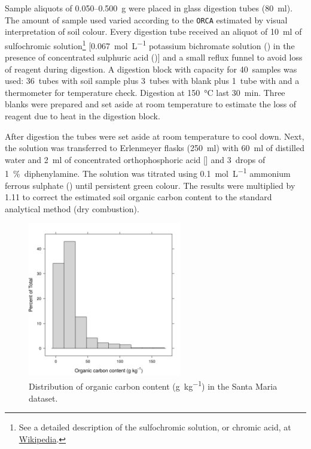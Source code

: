 \def\footsulfochromic{\footnote{See a detailed description of the sulfochromic solution, or chromic acid, at 
\href{http://en.wikipedia.org/wiki/Chromic_acid}{Wikipedia}.}}

Sample aliquots of \num{0.050}--\SI{0.500}{\g} were placed in glass digestion tubes (\SI{80}{\ml}). The 
amount of sample used varied according to the \texttt{ORCA} estimated by visual interpretation of soil colour. 
Every digestion tube received an aliquot of \SI{10}{\ml} of sulfochromic solution\footsulfochromic{} 
[\SI{0.067}{\mole\per\liter} potassium bichromate solution () in the presence of concentrated 
sulphuric acid ()] and a small reflux funnel to avoid loss of reagent during digestion. A digestion 
block with capacity for \num{40}~samples was used: \num{36}~tubes with soil sample plus \num{3}~tubes with 
blank plus \num{1}~tube with  and a thermometer for temperature check. Digestion at 
\SI{150}{\celsius} last \SI{30}{\minute}. Three blanks were prepared and set aside at room temperature to 
estimate the loss of reagent due to heat in the digestion block.

After digestion the tubes were set aside at room temperature to cool down. Next, the solution was transferred 
to Erlenmeyer flasks (\SI{250}{\ml}) with \SI{60}{\ml} of distilled water and \SI{2}{\ml} of concentrated 
orthophosphoric acid [] and \num{3}~drops of \SI{1}{\percent}~diphenylamine. The solution was 
titrated using \SI{0.1}{\mole\per\liter} ammonium ferrous sulphate () until persistent 
green colour. The results were multiplied by \num{1.11} to correct the estimated soil organic carbon content 
to the standard analytical method (dry combustion).

\begin{figure}[!ht]
\centering
\includegraphics[width=0.60\textwidth]{fig/chap04-orca}
\caption[Distribution of organic carbon content in the Santa Maria dataset.]{Distribution of organic carbon 
content (\si{\gram\per\kilo\gram}) in the Santa Maria dataset.}
\label{fig:chap04-orca}
\end{figure}


